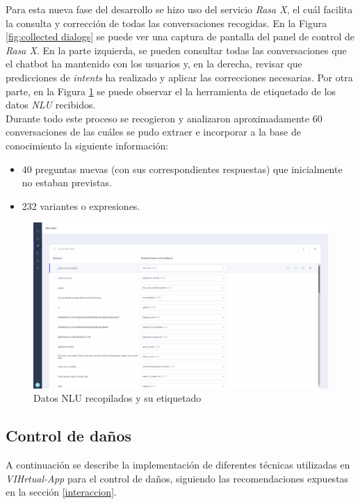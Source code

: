 Para esta nueva fase del desarrollo se hizo uso del servicio \textit{Rasa X}, el cuál facilita la consulta y corrección de todas las conversaciones recogidas. En la Figura \ref{fig:collected dialogs} se puede ver una captura de pantalla del panel de control de \textit{Rasa X}. En la parte izquierda, se pueden consultar todas las conversaciones que el chatbot ha mantenido con los usuarios y, en la derecha, revisar que predicciones de \textit{intents} ha realizado y aplicar las correcciones necesarias. Por otra parte, en la Figura \ref{fig:collected nlu} se puede observar el la herramienta de etiquetado de los datos \textit{NLU} recibidos.\\

Durante todo este proceso se recogieron y analizaron aproximadamente 60 conversaciones de las cuáles se pudo extraer e incorporar a la base de conocimiento la siguiente información:\\

\begin{itemize}
	\item 40 preguntas nuevas (con sus correspondientes respuestas) que inicialmente no estaban previstas.
	\item 232 variantes o expresiones.
\end{itemize}


\begin{figure}[htbp]
\centering
\includegraphics[scale=0.3]{../images/collected_nlu.png} 
\caption{Datos NLU recopilados y su etiquetado}
\label{fig:collected nlu}
\end{figure}

\subsection{Control de daños}
A continuación se describe la implementación de diferentes técnicas utilizadas en \textit{VIHrtual-App} para el control de daños, siguiendo las recomendaciones expuestas en la sección \ref{interaccion}.

